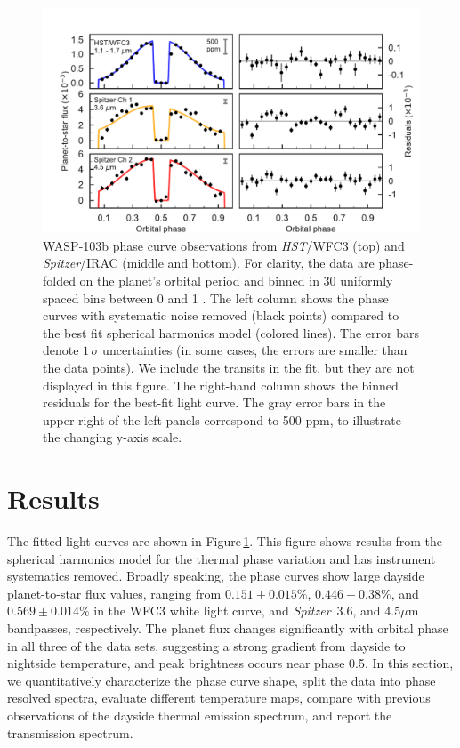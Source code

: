 \documentclass[twocolumn, trackchanges]{aastex61}
\newcommand{\project}[1]{\textsl{#1}}
\newcommand{\HST}{\project{HST}}
\newcommand{\Spitzer}{\project{Spitzer}}
\begin{document}
\begin{figure}
\includegraphics[width = 1.0\textwidth]{fig5.pdf}
\caption{WASP-103b phase curve observations from \HST/WFC3 (top) and
\Spitzer/IRAC (middle and bottom). For clarity, the data are phase-folded on the
planet's orbital period and binned in 30 uniformly spaced bins between 0 and 1
. The left column shows the phase curves with systematic noise removed (black points) compared to the best fit spherical harmonics model (colored lines). The error bars denote $1\,\sigma$ uncertainties (in some cases, the errors are smaller than the data points).  We include the transits in the fit, but they are not displayed in this figure. The right-hand column shows the binned residuals for the best-fit light curve. The gray error bars in the upper right of the left panels correspond to 500 ppm, to illustrate the changing y-axis scale.}
\label{fig:phasecurves}
\end{figure}

\section{Results}
\label{sec:results}
The fitted light curves are shown in Figure\,\ref{fig:phasecurves}. This figure shows results from the spherical harmonics model for the thermal phase variation and has instrument systematics removed.  Broadly speaking, the phase curves show large dayside planet-to-star flux values, ranging from $0.151\pm0.015\%$, $0.446\pm0.38\%$, and $0.569\pm0.014\%$ in the WFC3 white light curve, and \Spitzer\ $3.6$, and $4.5\mu$m bandpasses, respectively.  The planet flux changes significantly with orbital phase in all three of the data sets, suggesting a strong gradient from dayside to nightside temperature, and peak brightness occurs near phase 0.5. In this section, we quantitatively characterize the phase curve shape, split the data into phase resolved spectra, evaluate different temperature maps, compare with previous observations of the dayside thermal emission spectrum, and report the transmission spectrum.
\end{document}
